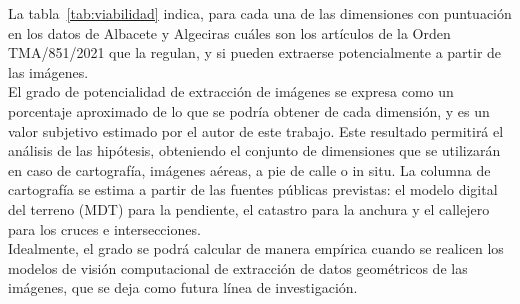 La tabla~\ref{tab:viabilidad} indica, para cada una de las dimensiones con puntuación en los datos de Albacete y Algeciras cuáles son los artículos de la Orden TMA/851/2021 \parencite{mitma_orden_tma851_2021} que la regulan, y si pueden extraerse potencialmente a partir de las imágenes.
\\

El grado de potencialidad de extracción de imágenes se expresa como un porcentaje aproximado de lo que se podría obtener de cada dimensión, y es un valor subjetivo estimado por el autor de este trabajo. Este resultado permitirá el análisis de las hipótesis, obteniendo el conjunto de dimensiones que se utilizarán en caso de cartografía, imágenes aéreas, a pie de calle o in situ. La columna de cartografía se estima a partir de las fuentes públicas previstas: el modelo digital del terreno (MDT) para la pendiente, el catastro para la anchura y el callejero para los cruces e intersecciones.
\\

Idealmente, el grado se podrá calcular de manera empírica cuando se realicen los modelos de visión computacional de extracción de datos geométricos de las imágenes, que se deja como futura línea de investigación.
\\

